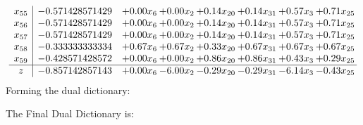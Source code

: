 \documentclass[8pt]{article}
\begin{document}
\[\begin{array}{c| c c@{\hskip 2pt} c@{\hskip 2pt} c@{\hskip 2pt} c@{\hskip 2pt} c@{\hskip 2pt} c@{\hskip 2pt} }
 x_{55}   &  -0.571428571429 & +  0.00 x_{6} & +  0.00 x_{2} & +  0.14 x_{20} & +  0.14 x_{31} & +  0.57 x_{3} & +  0.71 x_{25}\\
 x_{56}   &  -0.571428571429 & +  0.00 x_{6} & +  0.00 x_{2} & +  0.14 x_{20} & +  0.14 x_{31} & +  0.57 x_{3} & +  0.71 x_{25}\\
 x_{57}   &  -0.571428571429 & +  0.00 x_{6} & +  0.00 x_{2} & +  0.14 x_{20} & +  0.14 x_{31} & +  0.57 x_{3} & +  0.71 x_{25}\\
 x_{58}   &  -0.333333333334 & +  0.67 x_{6} & +  0.67 x_{2} & +  0.33 x_{20} & +  0.67 x_{31} & +  0.67 x_{3} & +  0.67 x_{25}\\
 x_{59}   &  -0.428571428572 & +  0.00 x_{6} & +  0.00 x_{2} & +  0.86 x_{20} & +  0.86 x_{31} & +  0.43 x_{3} & +  0.29 x_{25}\\
\hline
z    &  -0.857142857143 & +  0.00 x_{6} & -6.00 x_{2} & -0.29 x_{20} & -0.29 x_{31} & -6.14 x_{3} & -0.43 x_{25}\\
\end{array}\]
Forming the dual dictionary:

The Final Dual Dictionary is: 
\end{document}
